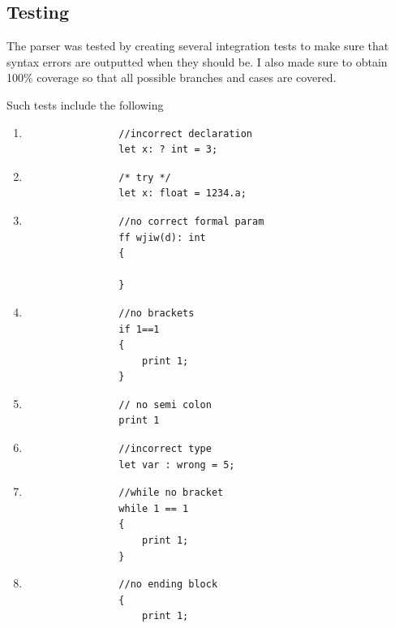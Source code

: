 \documentclass{article}
\begin{document}
				\subsection{Testing}
				
				The parser was tested by creating several integration tests to make sure that syntax errors are outputted when they should be. I also made sure to obtain 100\% coverage so that all possible branches and cases are covered.
				
				Such tests include the following
				
				\begin{enumerate}
				\item 
				\begin{lstlisting}
				//incorrect declaration
				let x: ? int = 3;
				\end{lstlisting}
				
				\item 
				\begin{lstlisting}
				/* try */
				let x: float = 1234.a;
				\end{lstlisting}
				
				\item 
				\begin{lstlisting}
				//no correct formal param
				ff wjiw(d): int
				{
			
				}
				\end{lstlisting}
				
				\item 
				\begin{lstlisting}
				//no brackets
				if 1==1
				{
					print 1;
				}
				\end{lstlisting}
				
				\item 
				\begin{lstlisting}
				// no semi colon
				print 1
				\end{lstlisting}
				
				\item 
				\begin{lstlisting}
				//incorrect type
				let var : wrong = 5;
				\end{lstlisting}
				
				\item 
				\begin{lstlisting}
				//while no bracket
				while 1 == 1
				{
					print 1;
				}
				\end{lstlisting}
				
				\item 
				\begin{lstlisting}
				//no ending block
				{
			    	print 1;
				\end{lstlisting}
				

\end{enumerate}
\end{document}
